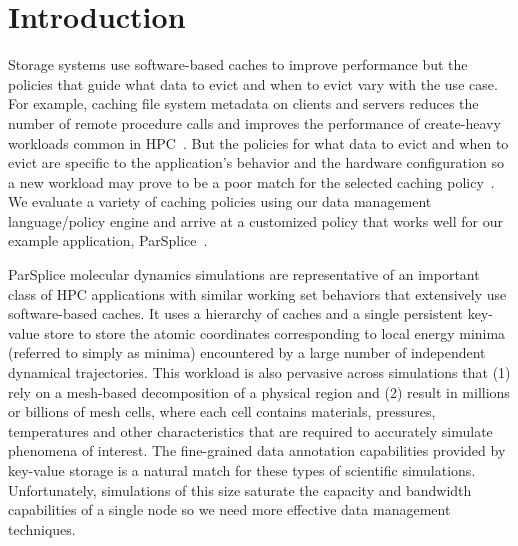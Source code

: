 \section{Introduction}

Storage systems use software-based caches to improve performance but the
policies that guide what data to evict and when to evict vary with the use
case. For example, caching file system metadata on clients and servers reduces
the number of remote procedure calls and improves the performance of
create-heavy workloads common in HPC~\cite{ren:sc2014-indexfs,
patil:fast2011-giga+, weil:sc2004-dyn-metadata}. But the policies for what data
to evict and when to evict are specific to the application's behavior and the
hardware configuration so a new workload may prove to be a poor match for the
selected caching
policy~\cite{xiao:socc15-shardfs,brandt:msst2003-lh,sevilla:sc15-mantle,
weil:sc2004-dyn-metadata, weil:osdi2006-ceph}. We evaluate a variety of caching
policies using our data management language/policy engine and arrive at a
customized policy that works well for our example application,
ParSplice~\cite{perez:jctc20150parsplice}.

ParSplice molecular dynamics simulations are representative of an important
class of HPC applications with similar working set behaviors that extensively
use software-based caches. It uses a hierarchy of caches and a single
persistent key-value store to store the atomic coordinates corresponding
to local energy minima (referred to simply as minima) encountered
by a large number of independent dynamical trajectories.
This workload is also pervasive
across simulations that (1) rely on a mesh-based decomposition of a physical
region and (2) result in millions or billions of mesh cells, where each cell
contains materials, pressures, temperatures and other characteristics that are
required to accurately simulate phenomena of interest.  The fine-grained data
annotation capabilities provided by key-value storage is a natural match for
these types of scientific simulations.  Unfortunately, simulations of this size
saturate the capacity and bandwidth capabilities of a single node so we need
more effective data management techniques.

